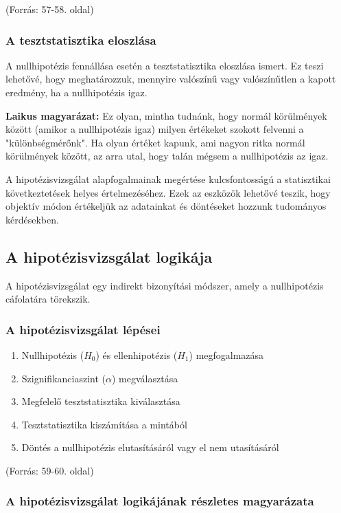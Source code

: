 \documentclass[a4paper,12pt]{article}
\begin{document}
    (Forrás: 57-58. oldal)

    \subsubsection{A tesztstatisztika eloszlása}

    A nullhipotézis fennállása esetén a tesztstatisztika eloszlása ismert. Ez teszi lehetővé, hogy meghatározzuk, mennyire valószínű vagy valószínűtlen a kapott eredmény, ha a nullhipotézis igaz.

    \textbf{Laikus magyarázat:}
    Ez olyan, mintha tudnánk, hogy normál körülmények között (amikor a nullhipotézis igaz) milyen értékeket szokott felvenni a "különbségmérőnk". Ha olyan értéket kapunk, ami nagyon ritka normál körülmények között, az arra utal, hogy talán mégsem a nullhipotézis az igaz.

    A hipotézisvizsgálat alapfogalmainak megértése kulcsfontosságú a statisztikai következtetések helyes értelmezéséhez. Ezek az eszközök lehetővé teszik, hogy objektív módon értékeljük az adatainkat és döntéseket hozzunk tudományos kérdésekben.

    \subsection{A hipotézisvizsgálat logikája}

    A hipotézisvizsgálat egy indirekt bizonyítási módszer, amely a nullhipotézis cáfolatára törekszik.

    \subsubsection{A hipotézisvizsgálat lépései}

    \begin{enumerate}
        \item Nullhipotézis ($H_0$) és ellenhipotézis ($H_1$) megfogalmazása
        \item Szignifikanciaszint ($\alpha$) megválasztása
        \item Megfelelő tesztstatisztika kiválasztása
        \item Tesztstatisztika kiszámítása a mintából
        \item Döntés a nullhipotézis elutasításáról vagy el nem utasításáról
    \end{enumerate}

    (Forrás: 59-60. oldal)

    \subsubsection{A hipotézisvizsgálat logikájának részletes magyarázata}
\end{document}

